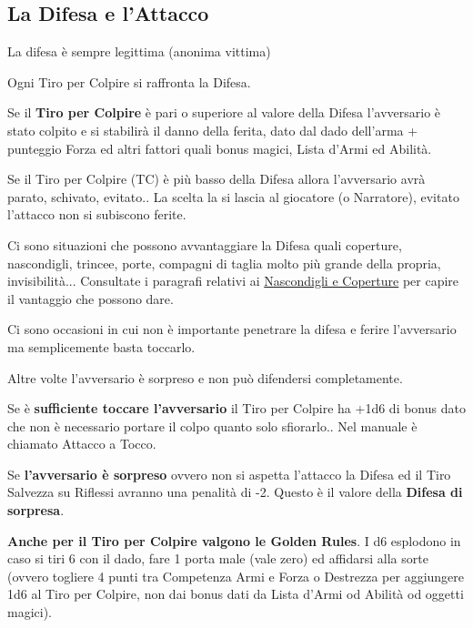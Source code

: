 \begin{multicols}{2}
\subsection{La Difesa e l'Attacco}\label{difesaeattacco}

\begin{changemargin}{0.3cm}{0.3cm}\begin{enfasi}{La difesa è sempre legittima (anonima vittima)}\end{enfasi}\end{changemargin}\medskip

Ogni Tiro per Colpire si raffronta la Difesa.

Se il \textbf{Tiro per Colpire} è pari o superiore al valore della Difesa l'avversario è stato colpito e si stabilirà il danno della ferita, dato dal dado dell'arma + punteggio Forza ed altri fattori quali bonus magici, Lista d'Armi ed Abilità.

Se il Tiro per Colpire (TC) è più basso della Difesa allora l'avversario avrà parato, schivato, evitato.. La scelta la si lascia al giocatore (o Narratore), evitato l'attacco non si subiscono ferite.

Ci sono situazioni che possono avvantaggiare la Difesa quali coperture, nascondigli, trincee, porte, compagni di taglia molto più grande della propria, invisibilità... Consultate i paragrafi relativi ai \hyperlink{copertura}{Nascondigli e Coperture} per capire il vantaggio che possono dare.

Ci sono occasioni in cui non è importante penetrare la difesa e ferire l'avversario ma semplicemente basta toccarlo.

Altre volte l'avversario è sorpreso e non può difendersi completamente.

Se è \textbf{sufficiente toccare l'avversario} il Tiro per Colpire ha +1d6 di bonus dato che non è necessario portare il colpo quanto solo sfiorarlo.. Nel manuale è chiamato Attacco a Tocco.\label{attaccoatocco}\hypertarget{attaccoatocco}{}\label{difesaatocco}

Se \textbf{l'avversario è sorpreso} ovvero non si aspetta l'attacco la Difesa ed il Tiro Salvezza su Riflessi avranno una penalità di -2. Questo è il valore della \textbf{Difesa di sorpresa}.\label{difesasorpresi}

\textbf{Anche per il Tiro per Colpire valgono le Golden Rules}. I d6 esplodono in caso si tiri 6 con il dado, fare 1 porta male (vale zero) ed affidarsi alla sorte (ovvero togliere 4 punti tra Competenza Armi e Forza o Destrezza per aggiungere 1d6 al Tiro per Colpire, non dai bonus dati da Lista d'Armi od Abilità od oggetti magici).


\end{multicols}
